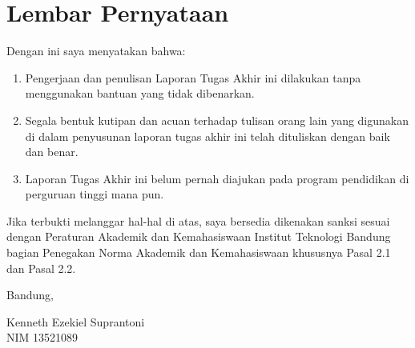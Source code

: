 \chapter*{Lembar Pernyataan}

Dengan ini saya menyatakan bahwa:

\begin{enumerate}

	\item Pengerjaan dan penulisan Laporan Tugas Akhir ini dilakukan tanpa menggunakan bantuan yang tidak dibenarkan.
	\item Segala bentuk kutipan dan acuan terhadap tulisan orang lain yang digunakan di dalam penyusunan laporan tugas akhir ini telah dituliskan dengan baik dan benar.
	\item Laporan Tugas Akhir ini belum pernah diajukan pada program pendidikan di perguruan tinggi mana pun.

\end{enumerate}

Jika terbukti melanggar hal-hal di atas, saya bersedia dikenakan sanksi sesuai dengan Peraturan Akademik dan Kemahasiswaan Institut Teknologi Bandung bagian Penegakan Norma Akademik dan Kemahasiswaan khususnya Pasal 2.1 dan Pasal 2.2.
\vspace{15mm}

Bandung, \tanggalpengesahan

\vspace{1.5cm}
Kenneth Ezekiel Suprantoni \\
NIM 13521089
